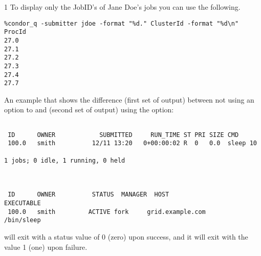 \begin{ManPage}{\label{man-condor-q}}{1}
To display only the JobID's of Jane Doe's jobs you can use the following.
\footnotesize
\begin{verbatim}
%condor_q -submitter jdoe -format "%d." ClusterId -format "%d\n" ProcId
27.0
27.1
27.2
27.3
27.4
27.7
\end{verbatim}
\normalsize

An example that shows the difference (first set of output)
between not using an option to  and (second
set of output) using the  option:
\footnotesize
\begin{verbatim}

 ID      OWNER            SUBMITTED     RUN_TIME ST PRI SIZE CMD
 100.0   smith          12/11 13:20   0+00:00:02 R  0   0.0  sleep 10

1 jobs; 0 idle, 1 running, 0 held



 ID      OWNER          STATUS  MANAGER  HOST                EXECUTABLE
 100.0   smith         ACTIVE fork     grid.example.com       /bin/sleep
\end{verbatim}
\normalsize

\ExitStatus

 will exit with a status value of 0 (zero) upon success,
and it will exit with the value 1 (one) upon failure.

\end{ManPage}
